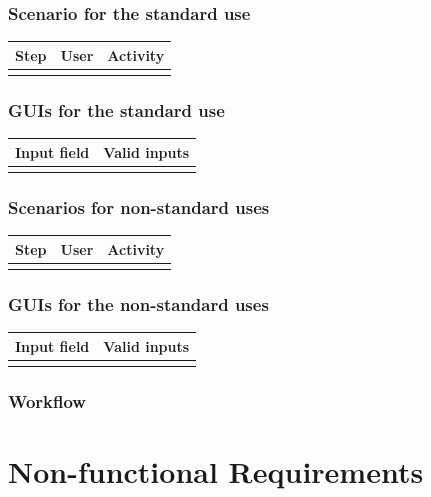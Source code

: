 \documentclass[12pt]{article}
\theoremstyle{definition}
\begin{document}
\subsubsection{Scenario for the standard use}

\begin{tabular}{|l|l|l|}
\hline
Step & User & Activity \\ \hline
 & & \\ \hline
\end{tabular}

\subsubsection{GUIs for the standard use}

\begin{tabular}{|l|l|}
\hline
Input field & Valid inputs \\ \hline
 &  \\ \hline
\end{tabular}

\subsubsection{Scenarios for non-standard uses}

\begin{tabular}{|l|l|l|}
\hline
Step & User & Activity \\ \hline
 & & \\ \hline
\end{tabular}

\subsubsection{GUIs for the non-standard uses}

\begin{tabular}{|l|l|}
\hline
Input field & Valid inputs \\ \hline
 &  \\ \hline
\end{tabular}

\subsubsection{Workflow}

\pagebreak

\section{Non-functional Requirements}
\end{document}
